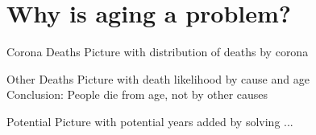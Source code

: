 \section{Why is aging a problem?}


\begin{frame}[c]{Corona Deaths}
    Picture with distribution of deaths by corona
\end{frame}


\begin{frame}[c]{Other Deaths}
    Picture with death likelihood by cause and age \\
    Conclusion: People die from age, not by other causes
\end{frame}


\begin{frame}[c]{Potential}
    Picture with potential years added by solving ...
\end{frame}


